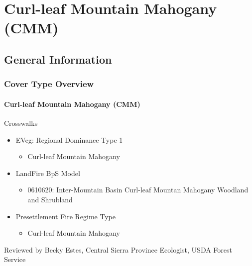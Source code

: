 
\section{Curl-leaf Mountain Mahogany (CMM)}

\subsection{General Information}

\subsubsection{Cover Type Overview}

\paragraph{Curl-leaf Mountain Mahogany (CMM)}

Crosswalks
\begin{itemize}
	\item EVeg: Regional Dominance Type 1
	\begin{itemize}
		\item Curl-leaf Mountain Mahogany
	\end{itemize}

	\item LandFire BpS Model
	\begin{itemize}
		\item 0610620: Inter-Mountain Basin Curl-leaf Mountan Mahogany Woodland and Shrubland
	\end{itemize}

	\item Presettlement Fire Regime Type
	\begin{itemize}
		\item Curl-leaf Mountain Mahogany
	\end{itemize}
\end{itemize}

Reviewed by Becky Estes, Central Sierra Province Ecologist, USDA Forest Service

